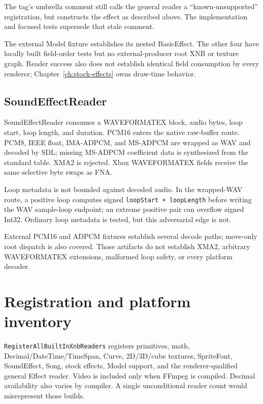 The tag's  umbrella comment still calls the general reader a
``known-unsupported'' registration, but  constructs the effect
as described above. The implementation and focused tests supersede that stale comment.

The external Model fixture establishes its nested BasicEffect. The other four have locally built
field-order tests but no external-producer root XNB or texture graph. Reader success also does
not establish identical field consumption by every renderer; Chapter~\ref{ch:stock-effects}
owns draw-time behavior.

\subsection{SoundEffectReader}
\label{sec:xnb-soundeffect-reader-contract}

SoundEffectReader consumes a WAVEFORMATEX block, audio bytes, loop start, loop length, and
duration. PCM16 enters the native raw-buffer route. PCM8, IEEE float, IMA-ADPCM, and MS-ADPCM are
wrapped as WAV and decoded by SDL; missing MS-ADPCM coefficient data is synthesized from the
standard table. XMA2 is rejected. Xbox WAVEFORMATEX fields receive the same selective byte swaps
as FNA.

Loop metadata is not bounded against decoded audio. In the wrapped-WAV route, a positive loop
computes signed \texttt{loopStart + loopLength} before writing the WAV sample-loop endpoint; an
extreme positive pair can overflow signed Int32. Ordinary loop metadata is tested, but this
adversarial edge is not.

External PCM16 and ADPCM fixtures establish several decode paths; move-only root dispatch is also
covered. Those artifacts do not establish XMA2, arbitrary WAVEFORMATEX extensions, malformed loop
safety, or every platform decoder.

\section{Registration and platform inventory}

\texttt{RegisterAllBuiltInXnbReaders} registers primitives, math, Decimal/DateTime/TimeSpan,
Curve, 2D/3D/cube textures, SpriteFont, SoundEffect, Song, stock effects, Model support, and the
renderer-qualified general Effect reader. Video is included only when FFmpeg is compiled.
Decimal availability also varies by compiler. A single unconditional reader count would
misrepresent those builds.

